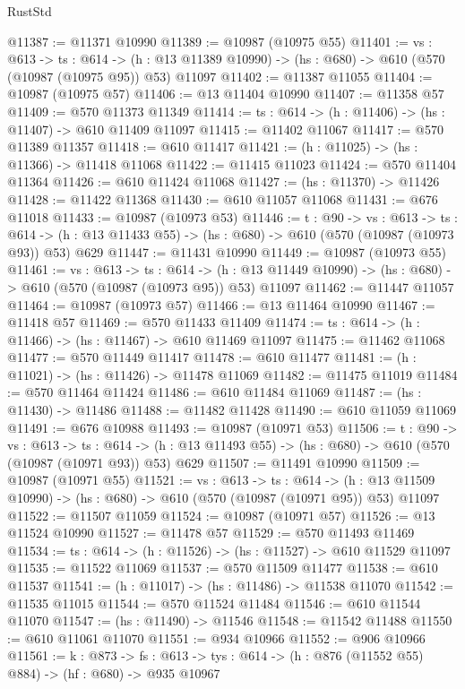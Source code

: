 \begin{lexlean}{RustStd}
\begin{coremodule}
@11387 := @11371 @10990
@11389 := @10987 (@10975 @55)
@11401 := {vs : @613} ->
  {ts : @614} ->
  (h : @13 @11389 @10990) -> (hs : @680) -> @610 (@570 (@10987 (@10975 @95)) @53) @11097
@11402 := @11387 @11055
@11404 := @10987 (@10975 @57)
@11406 := @13 @11404 @10990
@11407 := @11358 @57
@11409 := @570 @11373 @11349
@11414 := {ts : @614} -> (h : @11406) -> (hs : @11407) -> @610 @11409 @11097
@11415 := @11402 @11067
@11417 := @570 @11389 @11357
@11418 := @610 @11417
@11421 := (h : @11025) -> (hs : @11366) -> @11418 @11068
@11422 := @11415 @11023
@11424 := @570 @11404 @11364
@11426 := @610 @11424 @11068
@11427 := (hs : @11370) -> @11426
@11428 := @11422 @11368
@11430 := @610 @11057 @11068
@11431 := @676 @11018
@11433 := @10987 (@10973 @53)
@11446 := {t : @90} ->
  {vs : @613} ->
  {ts : @614} -> (h : @13 @11433 @55) -> (hs : @680) -> @610 (@570 (@10987 (@10973 @93)) @53) @629
@11447 := @11431 @10990
@11449 := @10987 (@10973 @55)
@11461 := {vs : @613} ->
  {ts : @614} ->
  (h : @13 @11449 @10990) -> (hs : @680) -> @610 (@570 (@10987 (@10973 @95)) @53) @11097
@11462 := @11447 @11057
@11464 := @10987 (@10973 @57)
@11466 := @13 @11464 @10990
@11467 := @11418 @57
@11469 := @570 @11433 @11409
@11474 := {ts : @614} -> (h : @11466) -> (hs : @11467) -> @610 @11469 @11097
@11475 := @11462 @11068
@11477 := @570 @11449 @11417
@11478 := @610 @11477
@11481 := (h : @11021) -> (hs : @11426) -> @11478 @11069
@11482 := @11475 @11019
@11484 := @570 @11464 @11424
@11486 := @610 @11484 @11069
@11487 := (hs : @11430) -> @11486
@11488 := @11482 @11428
@11490 := @610 @11059 @11069
@11491 := @676 @10988
@11493 := @10987 (@10971 @53)
@11506 := {t : @90} ->
  {vs : @613} ->
  {ts : @614} -> (h : @13 @11493 @55) -> (hs : @680) -> @610 (@570 (@10987 (@10971 @93)) @53) @629
@11507 := @11491 @10990
@11509 := @10987 (@10971 @55)
@11521 := {vs : @613} ->
  {ts : @614} ->
  (h : @13 @11509 @10990) -> (hs : @680) -> @610 (@570 (@10987 (@10971 @95)) @53) @11097
@11522 := @11507 @11059
@11524 := @10987 (@10971 @57)
@11526 := @13 @11524 @10990
@11527 := @11478 @57
@11529 := @570 @11493 @11469
@11534 := {ts : @614} -> (h : @11526) -> (hs : @11527) -> @610 @11529 @11097
@11535 := @11522 @11069
@11537 := @570 @11509 @11477
@11538 := @610 @11537
@11541 := (h : @11017) -> (hs : @11486) -> @11538 @11070
@11542 := @11535 @11015
@11544 := @570 @11524 @11484
@11546 := @610 @11544 @11070
@11547 := (hs : @11490) -> @11546
@11548 := @11542 @11488
@11550 := @610 @11061 @11070
@11551 := @934 @10966
@11552 := @906 @10966
@11561 := {k : @873} ->
  {fs : @613} -> {tys : @614} -> (h : @876 (@11552 @55) @884) -> (hf : @680) -> @935 @10967

\end{coremodule}
\end{lexlean}
